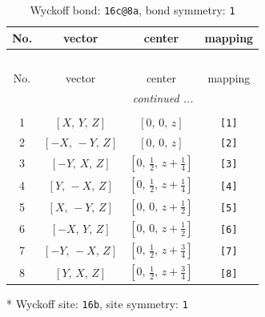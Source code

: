 \documentclass[fleqn,8pt]{jsarticle}
\begin{document}
\begin{longtable}{cccc}
\caption{Wyckoff bond: {\tt 16c@8a}, bond symmetry: {\tt 1}}
 \\
 \hline \hline
No. & vector & center & mapping \\ \hline \endfirsthead

\multicolumn{3}{l}{\tablename\ \thetable{}} \\
 \hline \hline
No. & vector & center & mapping \\ \hline \endhead

 \hline \hline
\multicolumn{3}{r}{\footnotesize\it continued ...} \\ \endfoot

 \hline \hline
\multicolumn{3}{r}{} \\ \endlastfoot

1 & $\left[ X,\, Y,\, Z \right]$ & $\left[ 0,\, 0,\, z \right]$ & {\tt [1]} \\ \hline
2 & $\left[ - X,\, - Y,\, Z \right]$ & $\left[ 0,\, 0,\, z \right]$ & {\tt [2]} \\ \hline
3 & $\left[ - Y,\, X,\, Z \right]$ & $\left[ 0,\, \frac{1}{2},\, z + \frac{1}{4} \right]$ & {\tt [3]} \\ \hline
4 & $\left[ Y,\, - X,\, Z \right]$ & $\left[ 0,\, \frac{1}{2},\, z + \frac{1}{4} \right]$ & {\tt [4]} \\ \hline
5 & $\left[ X,\, - Y,\, Z \right]$ & $\left[ 0,\, 0,\, z + \frac{1}{2} \right]$ & {\tt [5]} \\ \hline
6 & $\left[ - X,\, Y,\, Z \right]$ & $\left[ 0,\, 0,\, z + \frac{1}{2} \right]$ & {\tt [6]} \\ \hline
7 & $\left[ - Y,\, - X,\, Z \right]$ & $\left[ 0,\, \frac{1}{2},\, z + \frac{3}{4} \right]$ & {\tt [7]} \\ \hline
8 & $\left[ Y,\, X,\, Z \right]$ & $\left[ 0,\, \frac{1}{2},\, z + \frac{3}{4} \right]$ & {\tt [8]} \\
\end{longtable}
* Wyckoff site: {\tt 16b}, site symmetry: {\tt 1}
\renewcommand{\arraystretch}{1.2}
\end{document}
